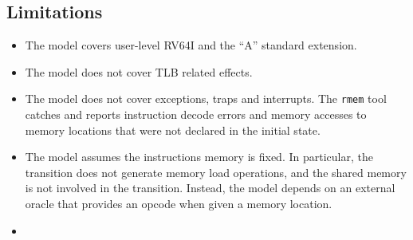 \subsection{Limitations}\label{sec:omm:limitations}
\begin{itemize}
\item The model covers user-level RV64I and the ``A'' standard extension.
\item The model does not cover TLB related effects.
\item The model does not cover exceptions, traps and interrupts.
The {\tt rmem} tool catches and reports instruction decode errors and memory accesses to memory locations that were not declared in the initial state.
\item The model assumes the instructions memory is fixed.
In particular, the  transition does not generate memory load operations, and the shared memory is not involved in the transition.
Instead, the model depends on an external oracle that provides an opcode when given a memory location.
\item {}
\end{itemize}

